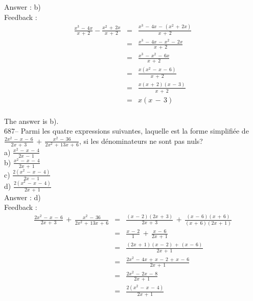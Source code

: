 \documentclass[letterpaper, 12pt]{article}
\begin{document}
Answer : b)\\

Feedback : \\
\begin{eqnarray*}
\frac{x^{3}\,-\,4x}{x\,+\,2}-\frac{x^{2}\,+\,2x}{x\,+\,2}&=&\frac{x^{3}\,-\,4x\,-\,(x^{2}\,+\,2x)}{x\,+\,2}\\[2mm]
&=&\frac{x^{3}\,-\,4x\,-\,x^{2}\,-\,2x}{x\,+\,2}\\[2mm]
&=&\frac{x^{3}\,-\,x^{2}\,-\,6x}{x\,+\,2}\\[2mm]
&=&\frac{x(x^{2}\,-\,x\,-\,6)}{x\,+\,2}\\[2mm]
&=&\frac{x(x\,+\,2)(x\,-\,3)}{x\,+\,2}\\[2mm]
&=&x(x\,-\,3)\\
\end{eqnarray*}

The answer is b).\\

687-- Parmi les quatre expressions suivantes, laquelle est la forme
simplifi\'ee de
$\frac{2x^{2}\,-\,x\,-\,6}{2x\,+\,3}\,+\,\frac{x^{2}\,-\,36}{2x^{2}\,+\,13x\,+\,6}$,
si les d\'enominateurs ne sont pas nuls?\\
a) $\frac{x^{2}\,-\,x\,-\,4}{2x\,-\,1}$\\[2mm]
b) $\frac{x^{2}\,-\,x\,-\,4}{2x\,+\,1}$\\[2mm]
c) $\frac{2(x^{2}\,-\,x\,-\,4)}{2x\,-\,1}$\\[2mm]
d) $\frac{2(x^{2}\,-\,x\,-\,4)}{2x\,+\,1}$\\[2mm]

Answer : d)\\

Feedback : \\
\begin{eqnarray*}
\frac{2x^{2}\,-\,x\,-\,6}{2x\,+\,3}\,+\,\frac{x^{2}\,-\,36}{2x^{2}\,+\,13x\,+\,6}&=&\frac{(x\,-\,2)(2x\,+\,3)}{2x\,+\,3}\,+\,\frac{(x\,-\,6)(x\,+\,6)}{(x\,+\,6)(2x\,+\,1)}\\[2mm]
&=&\frac{x\,-\,2}{1}\,+\,\frac{x\,-\,6}{2x\,+\,1}\\[2mm]
&=&\frac{(2x\,+\,1)(x\,-\,2)\,+\,(x\,-\,6)}{2x\,+\,1}\\[2mm]
&=&\frac{2x^{2}\,-\,4x\,+\,x\,-\,2\,+\,x\,-\,6}{2x\,+\,1}\\[2mm]
&=&\frac{2x^{2}\,-\,2x\,-\,8}{2x\,+\,1}\\[2mm]
&=&\frac{2(x^{2}\,-\,x\,-\,4)}{2x\,+\,1}\\
\end{eqnarray*}
\end{document}
